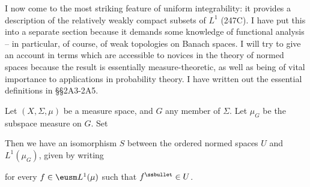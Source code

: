       
\def\chaptername{Function spaces} 
\def\sectionname{Weak compactness in $L^1$} 
      
      
I now come to the most striking feature of uniform integrability:  it 
provides a description of the relatively weakly compact subsets of 
$L^1$ (247C).   I have put this into a separate section because it 
demands some knowledge of functional analysis -- in 
particular, of course, of weak topologies on Banach spaces. 
I will try to give an account in terms which are accessible to 
novices in the theory of normed spaces because the result is 
essentially measure-theoretic, as 
well as being of vital importance to applications in probability theory. 
I have written out the essential definitions in  
\S\S2A3-2A5.  %
      
 Let $(X,\Sigma,\mu)$ be a measure space, and $G$ 
any member of $\Sigma$.   Let $\mu_G$ be the subspace measure on 
$G$.   Set 
      
      
\noindent Then we have 
an isomorphism $S$ between the ordered normed spaces $U$ and 
$L^1(\mu_G)$, given by writing 
      
      
\noindent for every $f\in\eusm L^1(\mu)$ such that $f^{\ssbullet}\in 
U$. 
      
